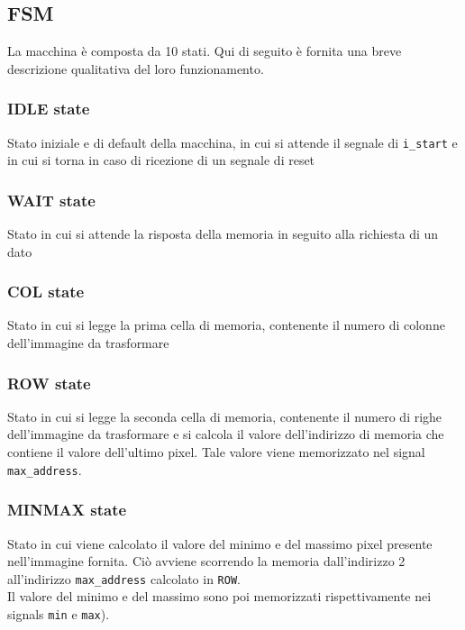 \documentclass{article}
\begin{document}
\subsection{FSM}
La macchina è composta da 10 stati. Qui di seguito è fornita una breve descrizione qualitativa del loro funzionamento.
\subsubsection{\textbf{IDLE} state}
Stato iniziale e di default della macchina, in cui si attende il segnale di \verb^i_start^ e in cui si torna in caso di ricezione di un segnale di reset
\subsubsection{\textbf{WAIT} state}
Stato in cui si attende la risposta della memoria in seguito alla richiesta di un dato
\subsubsection{\textbf{COL} state}
Stato in cui si legge la prima cella di memoria, contenente il numero di colonne dell'immagine da trasformare
\subsubsection{\textbf{ROW} state}
Stato in cui si legge la seconda cella di memoria, contenente il numero di righe dell'immagine da trasformare e si calcola il valore dell'indirizzo di memoria che contiene il valore dell'ultimo pixel. Tale valore viene memorizzato nel signal \verb^max_address^.
\subsubsection{\textbf{MIN\textunderscore MAX} state}
Stato in cui viene calcolato il valore del minimo e del massimo pixel presente nell'immagine fornita. Ciò avviene scorrendo la memoria dall'indirizzo 2 all'indirizzo \verb^max_address^ calcolato in \verb^ROW^.\\Il valore del minimo e del massimo sono poi memorizzati rispettivamente nei signals \verb^min^ e \verb^max^).
\end{document}
